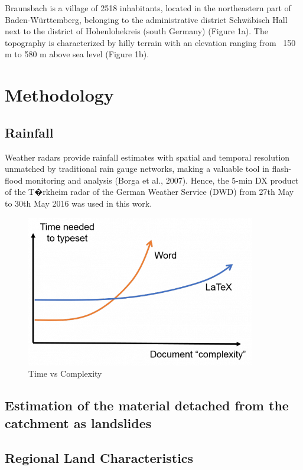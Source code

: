 \documentclass[10pt]{article}
\begin{document}
Braunsbach is a village of 2518 inhabitants, located in the northeastern part of Baden-W{\"u}rttemberg, belonging to the administrative district Schw{\"a}bisch Hall next to the district of Hohenlohekreis (south Germany) (Figure 1a). The topography is characterized by hilly terrain with an elevation ranging from ~150 m to 580 m above sea level (Figure 1b).

\section{Methodology}

\subsection{Rainfall}

Weather radars provide rainfall estimates with spatial and temporal resolution unmatched by traditional rain gauge networks, making a valuable tool in flash-flood monitoring and analysis (Borga et al., 2007). Hence, the 5-min DX product of the T�rkheim radar of the German Weather Service (DWD) from 27th May to 30th May 2016 was used in this work. 

\begin{figure}
  \centering
    \includegraphics[width=10cm]{figures/myplot1}
  \caption{Time vs Complexity}
\end{figure}

\subsection{Estimation of the material detached from the catchment as landslides}

\subsection{Regional Land Characteristics}
\end{document}
